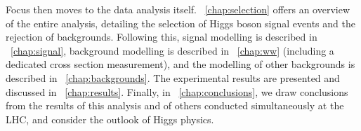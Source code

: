 Focus then moves to the data analysis itself. \Chapter~\ref{chap:selection} offers an 
overview of the entire \HWW analysis, detailing the selection of Higgs boson signal events 
and the rejection of backgrounds. Following this, signal modelling is described in 
\Chapter~\ref{chap:signal}, \WW background modelling is described in \Chapter~\ref{chap:ww} 
(including a dedicated cross section measurement), and the modelling of other backgrounds is 
described in \Chapter~\ref{chap:backgrounds}. The experimental results are presented and 
discussed in \Chapter~\ref{chap:results}. Finally, in \Chapter~\ref{chap:conclusions}, we 
draw conclusions from the results of this analysis and of others conducted simultaneously at 
the LHC, and consider the outlook of Higgs physics.


